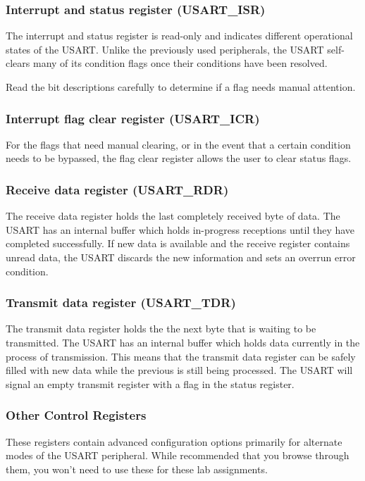 \documentclass[11pt,fleqn]{book} %
\begin{document}
\subsubsection{Interrupt and status register (USART\_ISR)}
The interrupt and status register is read-only and indicates different operational states of the USART. Unlike the previously used peripherals, the USART self-clears many of its condition flags once their conditions have been resolved. 

Read the bit descriptions carefully to determine if a flag needs manual attention.

\subsubsection{Interrupt flag clear register (USART\_ICR)}
For the flags that need manual clearing, or in the event that a certain condition needs to be bypassed, the flag clear register allows the user to clear status flags. 

\subsubsection{Receive data register (USART\_RDR)}
The receive data register holds the last completely received byte of data. The USART has an internal buffer which holds in-progress receptions until they have completed successfully. If new data is available and the receive register contains unread data, the USART discards the new information and sets an overrun error condition.

\subsubsection{Transmit data register (USART\_TDR)}
The transmit data register holds the the next byte that is waiting to be transmitted. The USART has an internal buffer which holds data currently in the process of transmission. This means that the transmit data register can be safely filled with new data while the previous is still being processed. The USART will signal an empty transmit register with a flag in the status register. 

\subsubsection{Other Control Registers}
These registers contain advanced configuration options primarily for alternate modes of the USART peripheral. While recommended that you browse through them, you won't need to use these for these lab assignments.
\end{document}
